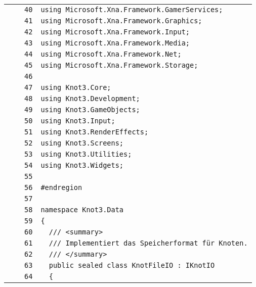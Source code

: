 \documentclass[a4paper,10pt]{article}
\begin{document}
\begin{longtable}[l]{lrrl}
\cellcolor{gray} &  & \verb~40~ & \verb~using Microsoft.Xna.Framework.GamerServices;~\\
\cellcolor{gray} &  & \verb~41~ & \verb~using Microsoft.Xna.Framework.Graphics;~\\
\cellcolor{gray} &  & \verb~42~ & \verb~using Microsoft.Xna.Framework.Input;~\\
\cellcolor{gray} &  & \verb~43~ & \verb~using Microsoft.Xna.Framework.Media;~\\
\cellcolor{gray} &  & \verb~44~ & \verb~using Microsoft.Xna.Framework.Net;~\\
\cellcolor{gray} &  & \verb~45~ & \verb~using Microsoft.Xna.Framework.Storage;~\\
\cellcolor{gray} &  & \verb~46~ & \verb~~\\
\cellcolor{gray} &  & \verb~47~ & \verb~using Knot3.Core;~\\
\cellcolor{gray} &  & \verb~48~ & \verb~using Knot3.Development;~\\
\cellcolor{gray} &  & \verb~49~ & \verb~using Knot3.GameObjects;~\\
\cellcolor{gray} &  & \verb~50~ & \verb~using Knot3.Input;~\\
\cellcolor{gray} &  & \verb~51~ & \verb~using Knot3.RenderEffects;~\\
\cellcolor{gray} &  & \verb~52~ & \verb~using Knot3.Screens;~\\
\cellcolor{gray} &  & \verb~53~ & \verb~using Knot3.Utilities;~\\
\cellcolor{gray} &  & \verb~54~ & \verb~using Knot3.Widgets;~\\
\cellcolor{gray} &  & \verb~55~ & \verb~~\\
\cellcolor{gray} &  & \verb~56~ & \verb~#endregion~\\
\cellcolor{gray} &  & \verb~57~ & \verb~~\\
\cellcolor{gray} &  & \verb~58~ & \verb~namespace Knot3.Data~\\
\cellcolor{gray} &  & \verb~59~ & \verb~{~\\
\cellcolor{gray} &  & \verb~60~ & \verb~  /// <summary>~\\
\cellcolor{gray} &  & \verb~61~ & \verb~  /// Implementiert das Speicherformat für Knoten.~\\
\cellcolor{gray} &  & \verb~62~ & \verb~  /// </summary>~\\
\cellcolor{gray} &  & \verb~63~ & \verb~  public sealed class KnotFileIO : IKnotIO~\\
\cellcolor{gray} &  & \verb~64~ & \verb~  {~\\

\end{longtable}
\end{document}
